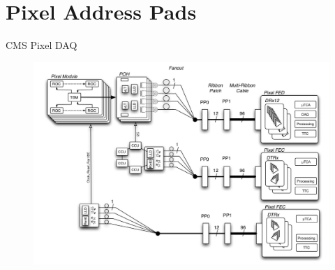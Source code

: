 \documentclass{beamer}
\begin{document}
\section{Pixel Address Pads}

\begin{frame}{CMS Pixel DAQ}
    \begin{figure}
        \centering
        \includegraphics[width=\textwidth]{"figures/Pixel Readout"}
    \end{figure}
\end{frame}
\end{document}
